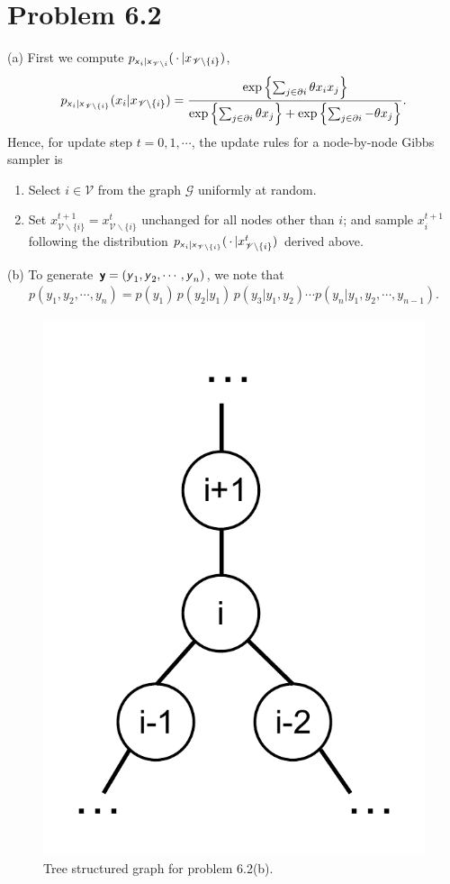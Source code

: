 \documentclass{article}
\newcommand{\s}[1]{\textsf{\textit{#1}}}
\newcommand{\bs}[1]{\textsf{\textbf{#1}}}
\begin{document}
\section*{Problem 6.2}
(a) First we compute
$p_{\s{x}_i | \s{x}_{\mathscr{V}\backslash i}}(\,\cdot \,| x_{\mathscr{V}\backslash \{i\}})$,
%
\begin{align}
	p_{\s{x}_i | \s{x}_{\mathscr{V}\backslash\{i\}}}(x_i| x_{\mathscr{V}\backslash \{i\}}) =
	\frac{\exp\left\{\sum_{j \in \partial i}\theta x_i x_j\right\}}
	{\exp\left\{\sum_{j \in \partial i}\theta x_j\right\} +
	\exp\left\{\sum_{j \in \partial i} -\theta x_j\right\}}. \label{eq:gibbs_node_sampler_prob}
\end{align}
Hence, for update step $t = 0, 1, \cdots$, the update rules for a node-by-node Gibbs sampler is
\begin{enumerate}
	\item Select $i \in \mathscr{V}$ from the graph $\mathscr{G}$ uniformly at random.
	\item Set $x^{t+1}_{\mathscr{V}\backslash\{i\}} = x^t_{\mathscr{V}\backslash\{i\}}$
	unchanged for all nodes other than $i$; and sample $x^{t+1}_i$ following the
	distribution $p_{\s{x}_i | \s{x}_{\mathscr{V}\backslash \{i\}}}
	(\,\cdot \,| x^t_{\mathscr{V}\backslash \{i\}})$ derived above.\\
\end{enumerate}

\noindent
(b) To generate $\bs{y} = (\s{y}_1, \s{y}_2, \cdots, \s{y}_n)$, we note that
\begin{align*}
	p(y_1, y_2, \cdots, y_n) = p(y_1)\, p (y_2 | y_1)\, p(y_3 | y_1, y_2) \cdots p(y_n | y_1, y_2, \cdots, y_{n-1}).
\end{align*}
%
\begin{figure}[h!]
  \centering
  \vspace{-0.3cm}
  \includegraphics[width=0.2\columnwidth]{62b.pdf}
    \vspace{-0.1cm}
  \caption{Tree structured graph for problem 6.2(b).}
  \label{f:62b}
\end{figure}
%
\end{document}

